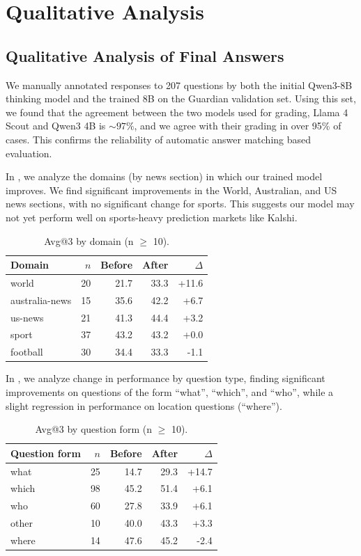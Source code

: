 \clearpage
\section{Qualitative Analysis}
\label{sec:qualitative_analysis}

\subsection{Qualitative Analysis of Final Answers}
\label{sec:qualia}

We manually annotated responses to 207 questions by both the initial Qwen3-8B thinking model and the trained \ourmodel  8B on the Guardian validation set. Using this set, we found that the agreement between the two models used for grading, Llama 4 Scout and Qwen3 4B is $\sim 97\%$, and we agree with their grading in over 95\% of cases. This confirms the reliability of automatic answer matching based evaluation.

In , we analyze the domains (by news section) in which our trained model improves. We find significant improvements in the World, Australian, and US news sections, with no significant change for sports. This suggests our model may not yet perform well on sports-heavy prediction markets like Kalshi.

\begin{table}[h]
\centering
\begin{tabular}{lrrrr}
\hline
Domain & $n$ & Before & After & $\Delta$ \\ 
\hline
world & 20 & 21.7 & 33.3 & +11.6 \\
australia-news & 15 & 35.6 & 42.2 & +6.7 \\
us-news & 21 & 41.3 & 44.4 & +3.2 \\
sport & 37 & 43.2 & 43.2 & +0.0 \\
football & 30 & 34.4 & 33.3 & -1.1 \\
\hline
\end{tabular}
\caption{Avg@3 by domain (n $\ge$ 10).}
\label{tab:domain}
\end{table}

In , we analyze change in performance by question type, finding significant improvements on questions of the form ``what'', ``which'', and ``who'', while a slight regression in performance on location questions (``where'').

\begin{table}[h]
\centering
\begin{tabular}{lrrrr}
\hline
Question form & $n$ & Before & After & $\Delta$ \\ 
\hline
what & 25 & 14.7 & 29.3 & +14.7 \\
which & 98 & 45.2 & 51.4 & +6.1 \\
who & 60 & 27.8 & 33.9 & +6.1 \\
other & 10 & 40.0 & 43.3 & +3.3 \\
where & 14 & 47.6 & 45.2 & -2.4 \\
\hline
\end{tabular}
\caption{Avg@3 by question form (n $\ge$ 10).}
\label{tab:questionform}
\end{table}


